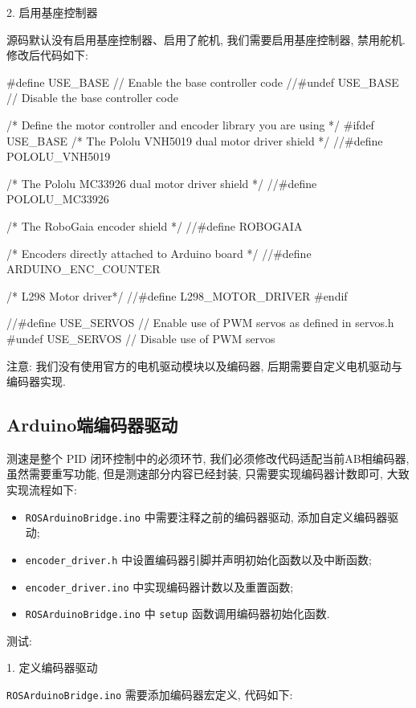 \documentclass[openany, fontset=windowsold]{ctexbook}
\theoremstyle{kaiti}
\theoremstyle{normal}
\begin{document}
2. 启用基座控制器

源码默认没有启用基座控制器、启用了舵机, 我们需要启用基座控制器, 禁用舵机. 修改后代码如下:

\begin{cpp}
  #define USE_BASE      // Enable the base controller code
  //#undef USE_BASE     // Disable the base controller code

  /* Define the motor controller and encoder library you are using */
  #ifdef USE_BASE
    /* The Pololu VNH5019 dual motor driver shield */
    //#define POLOLU_VNH5019

    /* The Pololu MC33926 dual motor driver shield */
    //#define POLOLU_MC33926

    /* The RoboGaia encoder shield */
    //#define ROBOGAIA

    /* Encoders directly attached to Arduino board */
    //#define ARDUINO_ENC_COUNTER

    /* L298 Motor driver*/
    //#define L298_MOTOR_DRIVER
  #endif

  //#define USE_SERVOS  // Enable use of PWM servos as defined in servos.h
  #undef USE_SERVOS     // Disable use of PWM servos
\end{cpp}

注意: 我们没有使用官方的电机驱动模块以及编码器, 后期需要自定义电机驱动与编码器实现.

\subsection{Arduino端编码器驱动}

测速是整个 PID 闭环控制中的必须环节, 我们必须修改代码适配当前AB相编码器, 虽然需要重写功能, 但是测速部分内容已经封装, 只需要实现编码器计数即可, 大致实现流程如下:

\begin{itemize}
  \item \verb|ROSArduinoBridge.ino| 中需要注释之前的编码器驱动, 添加自定义编码器驱动; 
  \item \verb|encoder_driver.h| 中设置编码器引脚并声明初始化函数以及中断函数; 
  \item \verb|encoder_driver.ino| 中实现编码器计数以及重置函数; 
  \item \verb|ROSArduinoBridge.ino| 中 \verb|setup| 函数调用编码器初始化函数.
\end{itemize}

测试:

1. 定义编码器驱动

\verb|ROSArduinoBridge.ino| 需要添加编码器宏定义, 代码如下:
\end{document}
